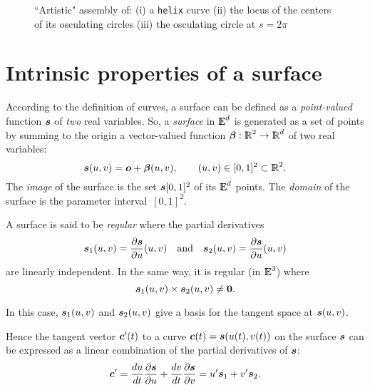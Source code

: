 \documentclass{31x47jw}
\begin{document}
\begin{figure}[h]
\centering{}
\caption{``Artistic" assembly of: (i) a \texttt{helix} curve (ii) 
the locus of the centers of its
osculating circles (iii) the osculating circle at $s=2\pi$
\label{fig:5:assembly}}
\end{figure}






\section{Intrinsic properties of a surface}

According to the definition of curves, a surface can be defined as a
\emph{point-valued} function ${\mbox{\boldmath $s$}}$ of \emph{two} real variables.  So, a
\emph{surface} in $ \mathbb{I\!\!E}^d$ is generated as a set of points by summing to
the origin a vector-valued function ${\mbox{\boldmath $\beta$}}: \mathbb{I\!\!R}^{2} \rightarrow
\mathbb{I\!\!R}^{d}$ of two real variables:
\[
{\mbox{\boldmath $s$}}(u,v) = {\mbox{\boldmath $o$}} + {\mbox{\boldmath $\beta$}}(u,v), \qquad (u,v)\in[0,1]^{2}\subset\mathbb{I\!\!R}^{2}.
\]
The \emph{image} of the surface is the set ${\mbox{\boldmath $s$}}[0,1]^{2}$ of its $
\mathbb{I\!\!E}^d$ points.  The \emph{domain} of the surface is the parameter
interval~$[0,1]^{2}$.

A surface is said to be \emph{regular} where the partial derivatives 
\[
{\mbox{\boldmath $s$}}_{1}(u,v) = {\partial{\mbox{\boldmath $s$}}\over\partial u}(u,v)
\quad\mbox{and}\quad
{\mbox{\boldmath $s$}}_{2}(u,v) = {\partial{\mbox{\boldmath $s$}}\over\partial u}(u,v)
\]
are linearly independent. In the same way, it is regular (in $\mathbb{I\!\!E}^{3}$) where 
\[
{\mbox{\boldmath $s$}}_{1}(u,v) \times {\mbox{\boldmath $s$}}_{2}(u,v) \not= {\mbox{\boldmath $0$}}.
\]

In this case, ${\mbox{\boldmath $s$}}_{1}(u,v)$ and ${\mbox{\boldmath $s$}}_{2}(u,v)$ give a basis for
the tangent space at ${\mbox{\boldmath $s$}}(u,v)$.

Hence the tangent vector ${\mbox{\boldmath $c$}}'(t)$ to a curve ${\mbox{\boldmath $c$}}(t) =
{\mbox{\boldmath $s$}}(u(t), v(t))$ on the surface ${\mbox{\boldmath $s$}}$ can be expressed as a linear
combination of the partial derivatives of ${\mbox{\boldmath $s$}}$:
\[
{\mbox{\boldmath $c$}}' = 
{du\over dt}{\partial {\mbox{\boldmath $s$}} \over \partial u} +
{dv\over dt}{\partial {\mbox{\boldmath $s$}} \over \partial v} = 
u' {\mbox{\boldmath $s$}}_{1} + v' {\mbox{\boldmath $s$}}_{2}.
\] 
\end{document}
